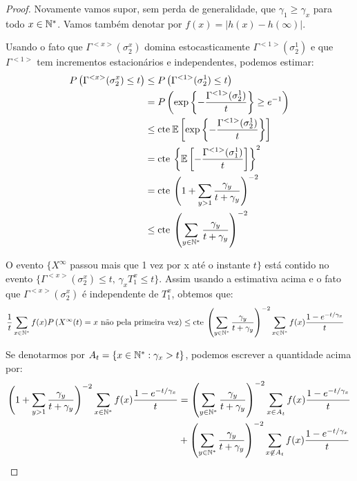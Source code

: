\begin{proof}
  Novamente vamos supor, sem perda de generalidade, que $\gamma_1 \geq
  \gamma_x$ para todo $x \in {\mathbb{N^*}}$. Vamos também denotar por $f(x) =
  |h(x) - h(\infty)|$.

  Usando o fato que $\Gamma^{<x>} (\sigma^x_2)$ domina
  estocasticamente $\Gamma^{<1>} (\sigma^1_2)$ e que $\Gamma^{<1>}$
  tem incrementos estacionários e independentes, podemos estimar:
  \begin{align*}
    P \left( \Gamma^{<x>} (\sigma^x_2) \leq t \right)
    &\leq P \left( \Gamma^{<1>} (\sigma^1_2) \leq t \right)\\
    &= P \left( \exp \left\{
        -\frac{\Gamma^{<1>}(\sigma^1_2)}{t}
      \right\}
        \geq e^{-1} \right)\\
    &\leq \mathrm{cte }\:
    {\mathbb{E}} \left[ \exp \left\{
        -\frac{\Gamma^{<1>}(\sigma^1_2)}{t}
      \right\} \right]\\
    &= \mathrm{cte} \: \left\{ {\mathbb{E}} \left[  -\frac{\Gamma^{<1>}(\sigma^1_1)}{t}
      \right] \right\}^2 \\
    &= \mathrm{cte} \: \left( 1 + \sum_{y > 1} \frac{\gamma_y}{t +
        \gamma_y}  \right)^{-2}\\
    &\leq \mathrm{cte} \: \left( \sum_{y \in {\mathbb{N^*}}} \frac{\gamma_y}{t +
        \gamma_y}  \right)^{-2}
  \end{align*}

  O evento $\{ X^\infty $ passou mais que 1 vez por x até o instante
  $t\}$ está contido no evento $\{ \Gamma^{<x>} (\sigma^x_2) \leq t,\,
  \gamma_x T^x_1 \leq t\}$. Assim usando a estimativa acima e o fato
  que $\Gamma^{<x>} (\sigma^x_2)$ é independente de $T_1^x$, obtemos
  que:
  \begin{align*}
    \frac{1}{t} \sum_{x\in{\mathbb{N^*}}} f(x) P\left( X^\infty(t) = x \text{ não
        pela primeira vez}\right) 
    &\leq \mathrm{cte} \: \left( \sum_{y \in {\mathbb{N^*}}} \frac{\gamma_y}{t +
        \gamma_y}  \right)^{-2} \sum_{x \in {\mathbb{N^*}}} f(x) \frac{1 - e^{-t/\gamma_x}}{t}
  \end{align*}

  Se denotarmos por $A_t = \{ x \in {\mathbb{N^*}}: \gamma_x > t \}$,
  podemos escrever a quantidade acima por:
  \begin{align}
    \label{eq:erro-gerador-partes}
    \left( 1 + \sum_{y > 1} \frac{\gamma_y}{t + \gamma_y} \right)^{-2}
    \sum_{x \in {\mathbb{N^*}}} f(x) \frac{1 - e^{-t/\gamma_x}}{t}
    &= \left( \sum_{y \in {\mathbb{N^*}}} \frac{\gamma_y}{t + \gamma_y} \right)^{-2}
    \sum_{x \in A_t} f(x) \frac{1 - e^{-t/\gamma_x}}{t}\\
    &+ \left( \sum_{y \in {\mathbb{N^*}}} \frac{\gamma_y}{t + \gamma_y} \right)^{-2}
    \sum_{x \not\in A_t} f(x) \frac{1 - e^{-t/\gamma_x}}{t} \notag
  \end{align}


\end{proof}
